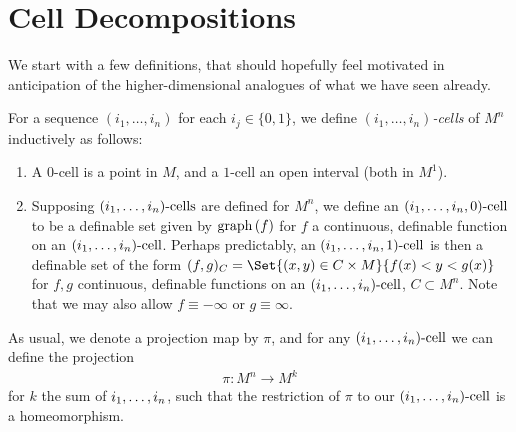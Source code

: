 \section{Cell Decompositions}

We start with a few definitions, that should hopefully feel motivated in anticipation of the higher-dimensional analogues of what we have seen already.

\begin{definition}[$\incells$ in $M^n$]
  For a sequence $(i_1, \hdots, i_n)$ for each $i_j \in \{0, 1\}$, we define $(i_1, \hdots, i_n)$\emph{-cells} of $M^n$ inductively as follows:
  \begin{enumerate}
    \item A $0$-cell is a point in $M$, and a $1$-cell an open interval (both in $M^1$).
    \item Supposing $\incells$ are defined for $M^n$, we define an $(i_1, \hdots, i_n, 0)\textrm{-cell}$ to be a definable set given by $\operatorname{graph}\left(f\right)$ for $f$ a continuous, definable function on an $(i_1, \hdots, i_n)\textrm{-cell}$. Perhaps predictably, an $(i_1, \hdots, i_n, 1)\textrm{-cell}$ is then a definable set of the form $(f, g)_C = \Set{(x, y) \in C \times M}{f(x) < y < g(x)}$ for $f, g$ continuous, definable functions on an $(i_1, \hdots, i_n)\textrm{-cell}$, $C \subset M^n$. Note that we may also allow $f \equiv - \infty$ or $g \equiv \infty$.
  \end{enumerate}

  As usual, we denote a projection map by $\pi$, and for any $(i_1, \hdots, i_n)\textrm{-cell}$ we can define the projection
  \begin{align*}
    \pi \colon M^n \to M^k
  \end{align*}
  for $k$ the sum of $i_1, \hdots, i_n$, such that the restriction of $\pi$ to our $(i_1, \hdots, i_n)\textrm{-cell}$ is a homeomorphism.


\end{definition}



